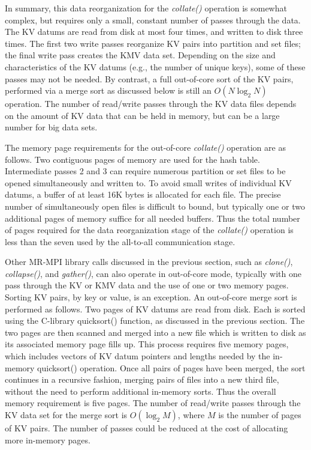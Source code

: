 In summary, this data reorganization for the {\it collate()} operation
is somewhat complex, but requires only a small, constant number of
passes through the data.  The KV datums are read from disk at most
four times, and written to disk three times.  The first two write
passes reorganize KV pairs into partition and set files; the final
write pass creates the KMV data set.  Depending on the size and
characteristics of the KV datums (e.g., the number of unique keys),
some of these passes may not be needed.  By contrast, a full
out-of-core sort of the KV pairs, performed via a merge sort as
discussed below is still an $O(N\log_2{N})$ operation.  The number of
read/write passes through the KV data files depends on the amount of
KV data that can be held in memory, but can be a large number for big
data sets.

The memory page requirements for the out-of-core {\it collate()}
operation are as follows.  Two contiguous pages of memory are used for
the hash table.  Intermediate passes 2 and 3 can require numerous
partition or set files to be opened simultaneously and written to.  To
avoid small writes of individual KV datums, a buffer of at least 16K
bytes is allocated for each file.  The precise number of
simultaneously open files is difficult to bound, but typically one or
two additional pages of memory suffice for all needed buffers.  Thus
the total number of pages required for the data reorganization stage
of the {\it collate()} operation is less than the seven used by the
all-to-all communication stage.

Other MR-MPI library calls discussed in the previous section, such as
{\it clone()}, {\it collapse()}, and {\it gather()}, can also operate
in out-of-core mode, typically with one pass through the KV or KMV
data and the use of one or two memory pages.  Sorting KV pairs, by key
or value, is an exception.  An out-of-core merge sort is performed as
follows.  Two pages of KV datums are read from disk.  Each is sorted
using the C-library quicksort() function, as discussed in the previous
section.  The two pages are then scanned and merged into a new file
which is written to disk as its associated memory page fills up.  This
process requires five memory pages, which includes vectors of KV datum
pointers and lengths needed by the in-memory quicksort() operation.
Once all pairs of pages have been merged, the sort continues in a
recursive fashion, merging pairs of files into a new third file,
without the need to perform additional in-memory sorts.  Thus the
overall memory requirement is five pages.  The number of read/write
passes through the KV data set for the merge sort is $O(\log_2{M})$,
where $M$ is the number of pages of KV pairs.  The number of passes
could be reduced at the cost of allocating more in-memory pages.

